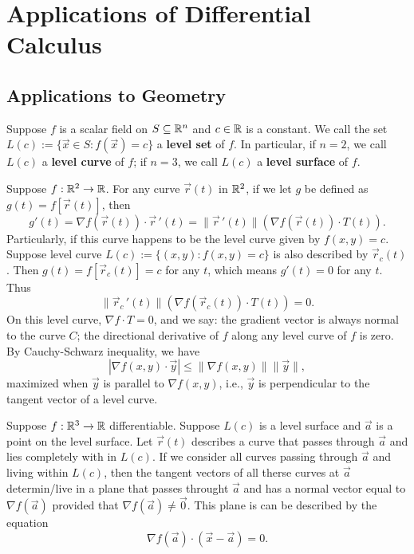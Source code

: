 \documentclass[a4paper]{ctexart}
\begin{document}
    \newpage
    \section{Applications of Differential Calculus}
    \subsection{Applications to Geometry}
    \begin{mydef}
        Suppose $f$ is a scalar field on $S\subseteq \mathbb{R}^n$ and $c\in \mathbb{R}$ is a constant. We call the set $L(c) := \{\vec x \in S: f(\vec x) = c\}$ a \textbf{level set} of $f$. In particular, if $n=2$, we call $L(c)$ a \textbf{level curve} of $f$; if $n=3$, we call $L(c)$ a \textbf{level surface} of $f$.
    \end{mydef}
    \begin{myex}
        Suppose $f:\mathbb{R}^2 \to \mathbb{R}$. For any curve $\vec r(t) $ in $\mathbb{R}^2$, if we let $g$ be defined as $g(t) = f[\vec r(t)]$, then $$g'(t) = \nabla f(\vec r(t)) \cdot \vec r\,'(t) = \| \vec r\,'(t)\| \left( \nabla f(\vec r(t)) \cdot T(t) \right).$$
        Particularly, if this curve happens to be the level curve given by $f(x,y)  = c$. Suppose level curve $L(c) := \{ (x,y) : f(x,y) = c\}$ is also described by $\vec r_c(t)$. Then $g(t) = f[\vec r_c(t)] = c$ for any $t$, which means $g'(t) = 0$ for any $t$. Thus
        $$
        \| \vec r_c\,'(t)\| \left( \nabla f(\vec r_c(t)) \cdot T(t) \right) = 0.
        $$
        On this level curve, $\nabla f \cdot T = 0$, and we say: the gradient vector is always normal to the curve $C$; the directional derivative of $f$ along any level curve of $f$ is zero. By Cauchy-Schwarz inequality, we have
        $$ |\nabla f(x,y) \cdot \vec y | \le \|\nabla f(x,y)\| \|\vec y\|, $$
        maximized when $\vec y$ is parallel to $\nabla f(x,y)$, i.e., $\vec y$ is perpendicular to the tangent vector of a level curve.
    \end{myex}
    \begin{myex}
        Suppose $f:\mathbb{R}^3 \to \mathbb{R}$ differentiable. Suppose $L(c)$ is a level surface and $\vec a$ is a point on the level surface. Let $\vec r (t)$ describes a curve that passes through $\vec a$ and lies completely with in $L(c)$. If we consider all curves passing through $\vec a $ and living within $L(c)$, then the tangent vectors of all therse curves at $\vec a$ determin/live in a plane that passes throught $\vec a$ and has a normal vector equal to $\nabla f(\vec a)$ provided that $\nabla f(\vec a) \ne \vec 0$. This plane is can be described by the equation
        $$ \nabla f(\vec a) \cdot (\vec x - \vec a) = 0. $$
    \end{myex}
\end{document}
